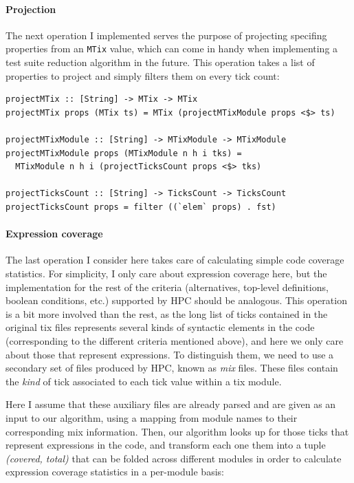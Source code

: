 \documentclass[a4paper,10pt]{article}
\begin{document}
\paragraph{Projection}

The next operation I implemented serves the purpose of projecting specifing
properties from an \texttt{MTix} value, which can come in handy when
implementing a test suite reduction algorithm in the future.
%
This operation takes a list of properties to project and simply filters them on
every tick count:

\begin{verbatim}
projectMTix :: [String] -> MTix -> MTix
projectMTix props (MTix ts) = MTix (projectMTixModule props <$> ts)

projectMTixModule :: [String] -> MTixModule -> MTixModule
projectMTixModule props (MTixModule n h i tks) =
  MTixModule n h i (projectTicksCount props <$> tks)

projectTicksCount :: [String] -> TicksCount -> TicksCount
projectTicksCount props = filter ((`elem` props) . fst)
\end{verbatim}

\paragraph{Expression coverage}

The last operation I consider here takes care of calculating simple code
coverage statistics.
%
For simplicity, I only care about expression coverage here, but the
implementation for the rest of the criteria (alternatives, top-level
definitions, boolean conditions, etc.) supported by HPC should be analogous.
%
This operation is a bit more involved than the rest, as the long list of ticks
contained in the original tix files represents several kinds of syntactic
elements in the code (corresponding to the different criteria mentioned above),
and here we only care about those that represent expressions.
%
To distinguish them, we need to use a secondary set of files produced by HPC,
known as \emph{mix} files.
%
These files contain the \emph{kind} of tick associated to each tick value within
a tix module.


Here I assume that these auxiliary files are already parsed and are given as an
input to our algorithm, using a mapping from module names to their corresponding
mix information.
%
Then, our algorithm looks up for those ticks that represent expressions in the
code, and transform each one them into a tuple \emph{(covered, total)} that can
be folded across different modules in order to calculate expression coverage
statistics in a per-module basis:
\end{document}
